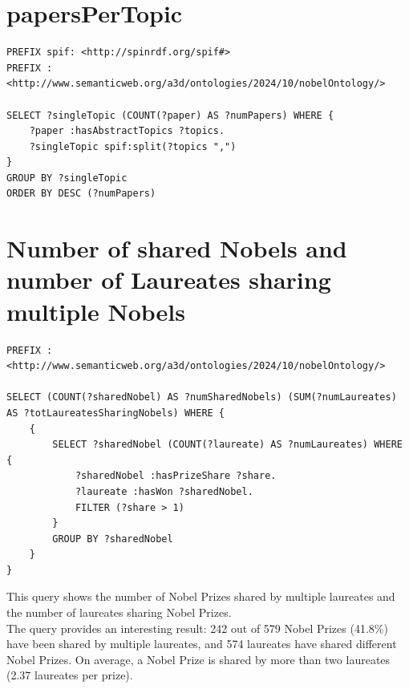 \documentclass{article}
\begin{document}
\section{papersPerTopic}

\begin{lstlisting}
PREFIX spif: <http://spinrdf.org/spif#>
PREFIX : <http://www.semanticweb.org/a3d/ontologies/2024/10/nobelOntology/>

SELECT ?singleTopic (COUNT(?paper) AS ?numPapers) WHERE {
    ?paper :hasAbstractTopics ?topics.
    ?singleTopic spif:split(?topics ",")
}
GROUP BY ?singleTopic
ORDER BY DESC (?numPapers)
\end{lstlisting}

\section{Number of shared Nobels and number of Laureates sharing multiple Nobels}

\begin{lstlisting}
PREFIX : <http://www.semanticweb.org/a3d/ontologies/2024/10/nobelOntology/>

SELECT (COUNT(?sharedNobel) AS ?numSharedNobels) (SUM(?numLaureates) AS ?totLaureatesSharingNobels) WHERE {
    {
        SELECT ?sharedNobel (COUNT(?laureate) AS ?numLaureates) WHERE {
            ?sharedNobel :hasPrizeShare ?share.
            ?laureate :hasWon ?sharedNobel.
            FILTER (?share > 1)
        }
        GROUP BY ?sharedNobel
    }
}
\end{lstlisting}

This query shows the number of Nobel Prizes shared by multiple laureates
and the number of laureates sharing Nobel Prizes.\\
The query provides an interesting result: 242 out of 579 Nobel Prizes (41.8\%) have
been shared by multiple laureates, and 574 laureates have shared different Nobel Prizes.
On average, a Nobel Prize is shared by more than two laureates (2.37 laureates per prize).
\end{document}
